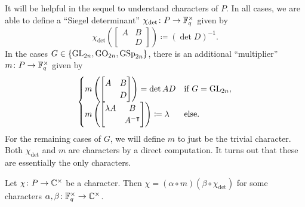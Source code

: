 It will be helpful in the sequel to understand characters of $P$. In all cases, we are able to define a ``Siegel determinant'' $\chi_{\det}\colon P\to\mathbb F_q^\times$ given by
\[\chi_{\det}\left(\begin{bmatrix}
    A & B \\
      & D
\end{bmatrix}\right)\coloneqq(\det D)^{-1}.\]
In the cases $G\in\{\mathrm{GL}_{2n},\mathrm{GO}_{2n},\mathrm{GSp}_{2n}\}$, there is an additional ``multiplier'' $m\colon P\to\mathbb F_q^\times$ given by
\[\begin{cases}
    m\left(\begin{bmatrix}
        A & B \\
          & D
    \end{bmatrix}\right)=\det AD & \text{if }G=\mathrm{GL}_{2n}, \\
    m\left(\begin{bmatrix}
        \lambda A & B \\
          & A^{-\intercal}
    \end{bmatrix}\right)\coloneqq\lambda & \text{else}.
\end{cases}\]
For the remaining cases of $G$, we will define $m$ to just be the trivial character. Both $\chi_{\det}$ and $m$ are characters by a direct computation. It turns out that these are essentially the only characters.
\begin{lemma} \label{lem:decompose-character}
    Let $\chi\colon P\to\mathbb C^\times$ be a character. Then $\chi=(\alpha\circ m)(\beta\circ\chi_{\det})$ for some characters $\alpha,\beta\colon\mathbb F_q^\times\to\mathbb C^\times$.
\end{lemma}
